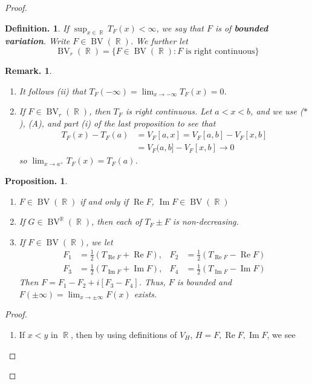 \documentclass[11pt, a4paper]{memoir}
\DeclareMathOperator{\R}{{\mathbb{R}}}
\theoremstyle{change}
\newtheorem{proposition}[theorem]{Proposition.}
\theoremstyle{plain}
\theoremstyle{nonumberplain}
\newtheorem{definition}{Definition.}
\newtheorem{remark}{Remark.}
\newtheorem{proof}{Proof}
\renewcommand{\Re}{\ensuremath{\operatorname{Re}}}
\renewcommand{\Im}{\ensuremath{\operatorname{Im}}}
\DeclareMathOperator{\BV}{BV}
\numberwithin{equation}{section}
\begin{document}
\begin{proof}
\begin{definition}
    If $\sup_{x\in\R}T_F(x)<\infty$, we say that $F$ is of \textbf{bounded variation}.
    Write $F\in\BV(\R)$.
    We further let
    \begin{equation*}
        \BV_r(\R)=\{F\in \BV(\R):F\text{ is right continuous}\}
    \end{equation*}
\end{definition}
\begin{remark}
    \begin{enumerate}[nl,r]
        \item It follows (ii) that $T_F(-\infty)=\lim_{x\to -\infty}T_F(x)=0$.
        \item If $F\in \BV_r(\R)$, then $T_F$ is right continuous.
            Let $a<x<b$, and we use ($*$), (A), and part (i) of the last proposition to see that
            \begin{align*}
                T_F(x)-T_F(a) &= V_F[a,x]=V_F[a,b]-V_F[x,b]\\
                              &= V_F(a,b]-V_F[x,b]\to 0
            \end{align*}
            so $\lim_{x\to a^+}T_F(x)=T_F(a)$.
    \end{enumerate}
\end{remark}
\begin{proposition}
    \begin{enumerate}[nl,r]
        \item $F\in\BV(\R)$ if and only if $\Re F$, $\Im F\in\BV(\R)$
        \item If $G\in\BV^{\R}(\R)$, then each of $T_F\pm F$ is non-decreasing.
        \item If $F\in\BV(\R)$, we let
            \begin{align*}
                F_1 &= \frac{1}{2}\left(T_{\Re F}+ \Re F\right), & F_2&=\frac{1}{2}\left(T_{\Re F}-\Re F\right)\\
                F_3 &= \frac{1}{2}\left(T_{\Im F}+ \Im F\right), & F_4&=\frac{1}{2}\left(T_{\Im F}-\Im F\right)
            \end{align*}
            Then $F=F_1-F_2+i[F_3-F_4]$.
            Thus, $F$ is bounded and $F(\pm\infty)=\lim_{x\to \pm\infty}F(x)$ exists.
    \end{enumerate}
\end{proposition}
\begin{proof}
    \begin{enumerate}[r]
        \item If $x<y$ in $\R$, then by using definitions of $V_H$, $H=F,\Re F,\Im F$, we see

\end{enumerate}
\end{proof}
\end{proof}
\end{document}
